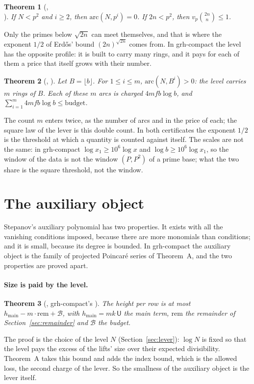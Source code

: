 \documentclass[11pt]{article}
\newtheorem{theorem}{Theorem}[section]
\theoremstyle{definition}
\theoremstyle{remark}
\begin{document}
\begin{theorem}[,\\ ]
If $N<p^2$ and $i\ge2$, then $\mathrm{arc}(N,p^i)=0$. If $2n<p^2$, then $v_p\binom{2n}{n}\le1$.
\end{theorem}

\noindent Only the primes below $\sqrt{2n}$ can meet themselves, and that is where the exponent
$1/2$ of Erd\H{o}s' bound $(2n)^{\sqrt{2n}}$ comes from. In grh-compact the level has the opposite
profile: it is built to carry many rings, and it pays for each of them a price that itself grows
with their number.

\begin{theorem}[, ]
Let $B=\lfloor b\rfloor$. For $1\le i\le m$, $\mathrm{arc}(N,B^i)>0$: the level carries $m$ rings
of $B$. Each of these $m$ arcs is charged $4mfb\log b$, and
$\sum_{i=1}^{m}4mfb\log b\le\mathrm{budget}$.
\end{theorem}

\noindent The count $m$ enters twice, as the number of arcs and in the price of each; the square
law of the lever is this double count. In both certificates the exponent $1/2$ is the threshold
at which a quantity is counted against itself. The scales are not the same: in grh-compact
$\log x_1\ge10^6\log x$ and $\log b\ge10^6\log x_1$, so the window of the data is not the window
$(P,P^2)$ of a prime base; what the two share is the square threshold, not the window.

\section{The auxiliary object}\label{sec:auxiliary}

Stepanov's auxiliary polynomial has two properties. It exists with all the vanishing conditions
imposed, because there are more monomials than conditions; and it is small, because its degree is
bounded. In grh-compact the auxiliary object is the family of projected Poincaré series of
Theorem~A, and the two properties are proved apart.

\paragraph{Size is paid by the level.}
\begin{theorem}[, grh-compact's ]
The height per row is at most $h_{\mathrm{main}}-m\cdot\mathrm{rem}+\mathcal B$, with
$h_{\mathrm{main}}=mk\,\mathsf U$ the main term, $\mathrm{rem}$ the remainder of
Section~\ref{sec:remainder} and $\mathcal B$ the budget.
\end{theorem}
The proof is the choice of the level $N$ (Section~\ref{sec:lever}): $\log N$ is fixed so that the
level pays the excess of the lifts' size over their expected divisibility. Theorem~A takes this
bound and adds the index bound, which is the allowed loss, the second charge of the lever. So the
smallness of the auxiliary object is the lever itself.
\end{document}
